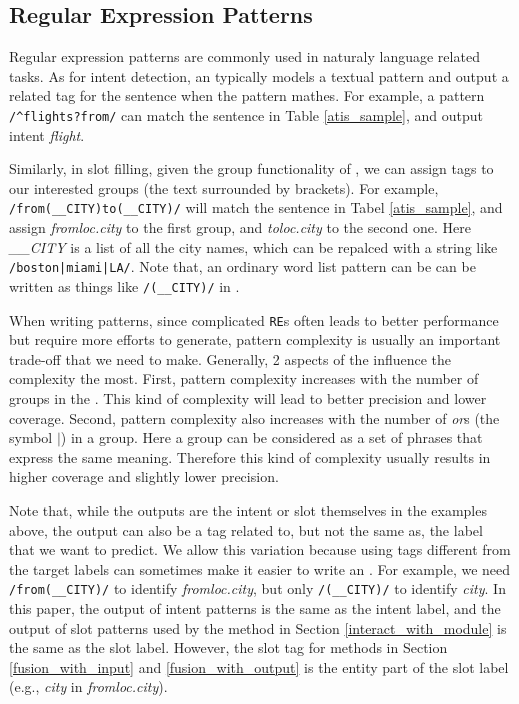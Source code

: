 \subsection{Regular Expression Patterns}
\label{re_desc}
Regular expression patterns are commonly used in naturaly language related tasks. As for intent detection, an \RE typically models a textual pattern and output a related tag for the sentence when the pattern mathes. For example, a pattern 
\texttt{/\textasciicircum flights?\:from/} can match the sentence in Table \ref{atis_sample}, and output intent \emph{flight}. 


Similarly, in slot filling, given the group functionality of \RE, we can assign tags to our interested groups (the text surrounded by brackets). For example, \texttt{/from\:(\_\_CITY)\:to\:(\_\_CITY)/} will match the sentence in Tabel \ref{atis_sample}, and assign \emph{fromloc.city} to the first group, and \emph{toloc.city} to the second one. Here \emph{\_\_CITY} is a list of all the city names, which can be repalced with a string like \texttt{/boston|miami|LA/}. 
Note that, an ordinary word list pattern can be can be written as things like \texttt{/(\_\_CITY)/} in \RE.

When writing \RE patterns, since complicated \texttt{RE}s often leads to better performance but require more efforts to generate, pattern complexity is usually an important trade-off that we need to make. Generally, 2 aspects of the \RE influence the complexity the most. First, pattern complexity increases with the number of groups in the \RE. This kind of complexity will lead to better precision and lower coverage. Second, pattern complexity also increases with the number of \emph{or}s (the symbol $|$) in a group. Here a group can be considered as a set of phrases that express the same meaning. Therefore this kind of complexity usually results in higher coverage and slightly lower precision. 

Note that, while the outputs are the intent or slot themselves in the examples above, the \RE output can also be a tag related to, but not the same as, the label that we want to predict.
We allow this variation because using tags different from the target labels can sometimes make it easier to write an \RE. For example, we need \texttt{/from\:(\_\_CITY)/} to identify \emph{fromloc.city}, but only \texttt{/(\_\_CITY)/} to identify \emph{city}. In this paper, the output of intent patterns is the same as the intent label, and the output of slot patterns used by the method in Section \ref{interact_with_module} is the same as the slot label. However, the slot \RE tag for methods in Section \ref{fusion_with_input} and \ref{fusion_with_output} is the entity part of the slot label (e.g., \emph{city} in \emph{fromloc.city}).



